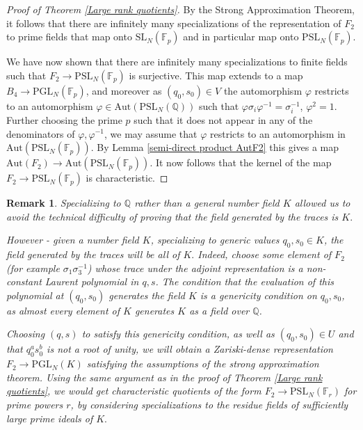 \documentclass[letterpaper]{amsart}
\newtheorem{remark}[theorem]{Remark}
\begin{document}
\begin{proof}[Proof of Theorem \ref{Large rank quotients}]
By the Strong Approximation Theorem, it follows that there are infinitely many specializations of the representation of $F_2$ to prime fields that map onto $\mathrm{SL}_N(\mathbb{F}_p)$ and in particular map onto $\mathrm{PSL}_N(\mathbb{F}_p).$

We have now shown that there are infinitely many specializations to finite fields such that $F_2 \to \mathrm{PSL}_N(\mathbb{F}_p)$ is surjective. This map extends to a map $B_4 \to \mathrm{PGL}_N(\mathbb{F}_p)$, and moreover as $(q_0, s_0) \in V$ the automorphism $\varphi$ restricts to an automorphism $\varphi \in \mathrm{Aut}(\mathrm{PSL}_N(\mathbb{Q}))$ such that $\varphi\sigma_i\varphi^{-1} = \sigma_i^{-1}$, $\varphi^2 = 1$. Further choosing the prime $p$ such that it does not appear in any of the denominators of $\varphi, \varphi^{-1}$, we may assume that $\varphi$ restricts to an automorphism in $\mathrm{Aut}(\mathrm{PSL}_N(\mathbb{F}_p)).$ By Lemma \ref{semi-direct product AutF2} this gives a map $\mathrm{Aut}(F_2) \to \mathrm{Aut}(\mathrm{PSL}_N(\mathbb{F}_p)).$ It now follows that the kernel of the map $F_2 \to \mathrm{PSL}_N(\mathbb{F}_p)$ is characteristic.
\end{proof}
\begin{remark}
\label{specializations to number fields}
Specializing to $\mathbb{Q}$ rather than a general number field $K$ allowed us to avoid the technical difficulty of proving that the field generated by the traces is $K.$

However - given a number field $K$, specializing to generic values $q_0, s_0 \in K$, the field generated by the traces will be all of $K.$ Indeed, choose some element of $F_2$ (for example $\sigma_1 \sigma_3^{-1}$) whose trace under the adjoint representation is a non-constant Laurent polynomial in $q, s$. The condition that the evaluation of this polynomial at $(q_0, s_0)$ generates the field $K$ is a genericity condition on $q_0, s_0$, as almost every element of $K$ generates $K$ as a field over $\mathbb{Q}$.

Choosing $(q, s)$ to satisfy this genericity condition, as well as $(q_0, s_0) \in U$ and that $q_0^as_0^b$ is not a root of unity, we will obtain a Zariski-dense representation $F_2 \to \mathrm{PGL}_N(K)$ satisfying the assumptions of the strong approximation theorem. Using the same argument as in the proof of Theorem \ref{Large rank quotients}, we would get characteristic quotients of the form $F_2 \to \mathrm{PSL}_N(\mathbb{F}_r)$ for prime powers $r$, by considering specializations to the residue fields of sufficiently large prime ideals of $K.$
\end{remark}
\end{document}
